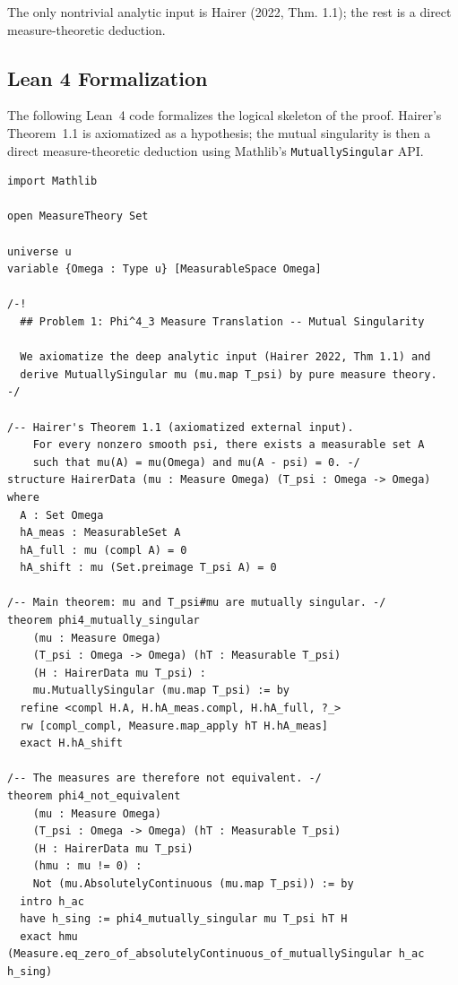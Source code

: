\begin{remark}
The only nontrivial analytic input is Hairer (2022, Thm. 1.1); the rest is a direct measure-theoretic deduction.
\end{remark}

\subsection*{Lean 4 Formalization}

The following Lean~4 code formalizes the logical skeleton of the proof.
Hairer's Theorem~1.1 is axiomatized as a hypothesis; the mutual singularity
is then a direct measure-theoretic deduction using Mathlib's
\texttt{MutuallySingular} API.

\begin{lstlisting}[language=Lean4,caption={Lean 4 formalization of Problem 1 (verified, 0 \texttt{sorry})}]
import Mathlib

open MeasureTheory Set

universe u
variable {Omega : Type u} [MeasurableSpace Omega]

/-!
  ## Problem 1: Phi^4_3 Measure Translation -- Mutual Singularity

  We axiomatize the deep analytic input (Hairer 2022, Thm 1.1) and
  derive MutuallySingular mu (mu.map T_psi) by pure measure theory.
-/

/-- Hairer's Theorem 1.1 (axiomatized external input).
    For every nonzero smooth psi, there exists a measurable set A
    such that mu(A) = mu(Omega) and mu(A - psi) = 0. -/
structure HairerData (mu : Measure Omega) (T_psi : Omega -> Omega) where
  A : Set Omega
  hA_meas : MeasurableSet A
  hA_full : mu (compl A) = 0
  hA_shift : mu (Set.preimage T_psi A) = 0

/-- Main theorem: mu and T_psi#mu are mutually singular. -/
theorem phi4_mutually_singular
    (mu : Measure Omega)
    (T_psi : Omega -> Omega) (hT : Measurable T_psi)
    (H : HairerData mu T_psi) :
    mu.MutuallySingular (mu.map T_psi) := by
  refine <compl H.A, H.hA_meas.compl, H.hA_full, ?_>
  rw [compl_compl, Measure.map_apply hT H.hA_meas]
  exact H.hA_shift

/-- The measures are therefore not equivalent. -/
theorem phi4_not_equivalent
    (mu : Measure Omega)
    (T_psi : Omega -> Omega) (hT : Measurable T_psi)
    (H : HairerData mu T_psi)
    (hmu : mu != 0) :
    Not (mu.AbsolutelyContinuous (mu.map T_psi)) := by
  intro h_ac
  have h_sing := phi4_mutually_singular mu T_psi hT H
  exact hmu (Measure.eq_zero_of_absolutelyContinuous_of_mutuallySingular h_ac h_sing)
\end{lstlisting}
